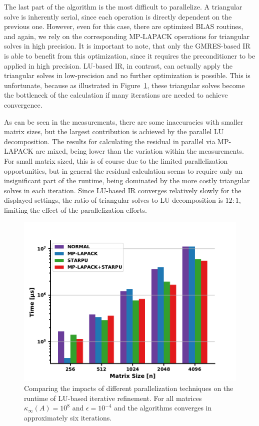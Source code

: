 The last part of the algorithm is the most difficult to parallelize. A triangular solve is inherently serial, since each operation is directly dependent on the previous one. However, even for this case, there are optimized BLAS routines, and again, we rely on the corresponding MP-LAPACK operations for triangular solves in high precision. It is important to note, that only the GMRES-based IR is able to benefit from this optimization, since it requires the preconditioner to be applied in high precision. LU-based IR, in contrast, can actually apply the triangular solves in low-precision and no further optimization is possible. This is unfortunate, because as illustrated in Figure~\hyperref[fig:lu_parallel]{\ref{fig:lu_parallel}}, these triangular solves become the bottleneck of the calculation if many iterations are needed to achieve convergence. 

As can be seen in the measurements, there are some inaccuracies with smaller matrix sizes, but the largest contribution is achieved by the parallel LU decomposition. The results for calculating the residual in parallel via MP-LAPACK are mixed, being lower than the variation within the measurements. For small matrix sized, this is of course due to the limited parallelization opportunities, but in general the residual calculation seems to require only an  insignificant part of the runtime, being dominated by the more costly triangular solves in each iteration. Since LU-based IR converges relatively slowly for the displayed settings, the ratio of triangular solves to LU decomposition is $12 : 1$, limiting the effect of the parallelization efforts.

\begin{figure}[h]
    \centering
    \includegraphics[width=0.8\linewidth]{chapters/5_experiments/figures/LU_parallel.pdf}
    \caption[Parallel LU-based IR]{Comparing the impacts of different parallelization techniques on the runtime of LU-based iterative refinement. For all matrices $\kappa_\infty(A)=10^8$ and $\epsilon=10^{-4}$ and the algorithms converges in approximately six iterations.}
    \label{fig:lu_parallel}
\end{figure}

